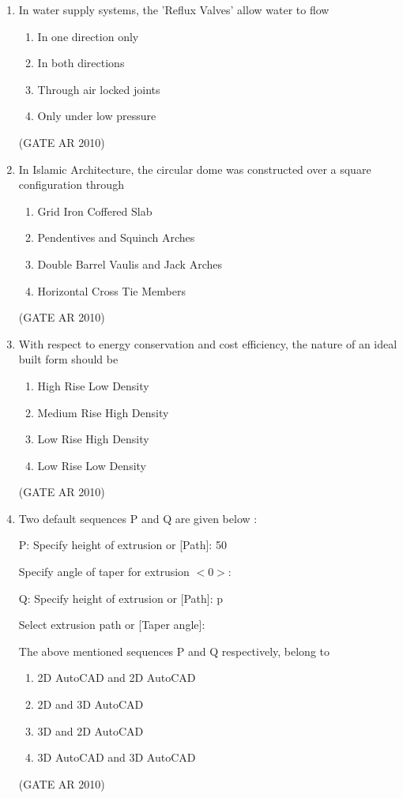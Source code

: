 \documentclass[journal]{IEEEtran}
\begin{document}
\begin{enumerate}
\item In water supply systems, the 'Reflux Valves' allow water to flow
\begin{multicols}{2}
\begin{enumerate}
\item In one direction only
\item In both directions
\item Through air locked joints
\item Only under low pressure
\end{enumerate}
\end{multicols}
\hfill (GATE AR 2010)

\item In Islamic Architecture, the circular dome was constructed over a square configuration through
\begin{enumerate}
\item Grid Iron Coffered Slab
\item Pendentives and Squinch Arches
\item Double Barrel Vaulis and Jack Arches
\item Horizontal Cross Tie Members
\end{enumerate}
\hfill (GATE AR 2010)

\item With respect to energy conservation and cost efficiency, the nature of an ideal built form should be
\begin{multicols}{2}
\begin{enumerate}
\item High Rise Low Density
\item Medium Rise High Density
\item Low Rise High Density
\item Low Rise Low Density
\end{enumerate}
\end{multicols}
\hfill (GATE AR 2010)

\item Two default sequences P and Q are given below :

P: Specify height of extrusion or [Path]: 50

Specify angle of taper for extrusion $<0>$:

Q: Specify height of extrusion or [Path]: p

Select extrusion path or [Taper angle]:

The above mentioned sequences P and Q respectively, belong to
\begin{multicols}{2}
\begin{enumerate}
\item 2D AutoCAD and 2D AutoCAD
\item 2D and 3D AutoCAD
\item 3D and 2D AutoCAD
\item 3D AutoCAD and 3D AutoCAD
\end{enumerate}
\end{multicols}
\hfill (GATE AR 2010)


\end{enumerate}
\end{document}
